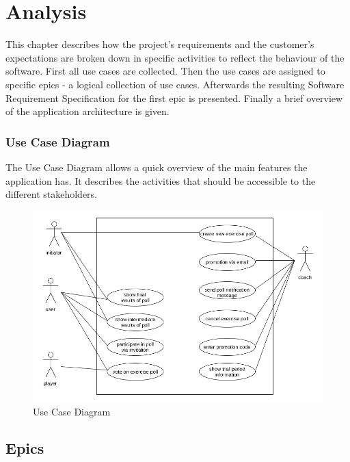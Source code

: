 \section{Analysis}
\label{sec:analysis}

This chapter describes how the project's requirements and the customer's expectations are broken down in specific activities to reflect the behaviour of the software.
First all use cases are collected. Then the use cases are assigned to specific epics - a logical collection of use cases. Afterwards the resulting Software Requirement Specification for the first epic is presented. Finally a brief overview of the application architecture is given.

\subsubsection{Use Case Diagram}
\label{sssec:use_case_diagram}

The Use Case Diagram allows a quick overview of the main features the application has. It describes the activities that should be accessible to the different stakeholders.\\

\begin{figure}[H]
    \begin{center}
        \includegraphics[width=\textwidth]{images/ucd.png}
        \caption{Use Case Diagram}
        \label{fig:ucd}
    \end{center}
\end{figure}

\subsection{Epics}
\label{ssec:epics}

